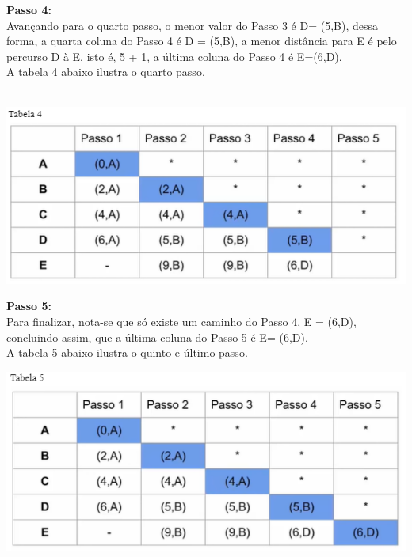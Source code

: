 \documentclass[11pt]{article} %
\begin{document}
\begin{enumerate}[a)]
\newpage

{\bf Passo 4:} \\

Avançando para o quarto passo, o menor valor do Passo 3 é D= (5,B), dessa forma, a quarta coluna do Passo 4 é D = (5,B), a menor distância para E é pelo percurso D à E, isto é, 5 + 1, a última coluna do Passo 4 é E=(6,D). \\ A tabela 4 abaixo ilustra o quarto passo. \\ \\

		\begin{center}
			\includegraphics[scale = 0.9]{q2e4.png}
		\end{center}

\newpage

{\bf Passo 5:} \\

Para finalizar, nota-se que só existe um caminho do Passo 4, E = (6,D), concluindo assim, que a última coluna do  Passo 5 é  E= (6,D). \\ A tabela 5 abaixo ilustra o quinto e último passo. \\

		\begin{center}
			\includegraphics[scale = 0.9]{q2e5.png}
		\end{center}

	\end{enumerate}
\end{document}
